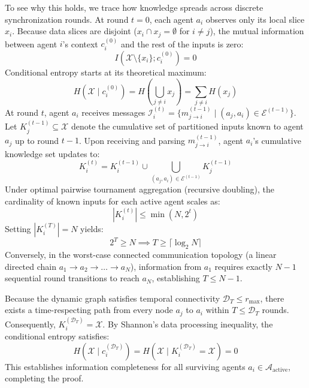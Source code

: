 \documentclass{ieeeaccess}
\begin{document}
\begin{IEEEproof}
To see why this holds, we trace how knowledge spreads across discrete synchronization rounds.
At round $t=0$, each agent $a_i$ observes only its local slice $x_i$. Because data slices are disjoint ($x_i \cap x_j = \emptyset$ for $i \neq j$), the mutual information between agent $i$'s context $c_i^{(0)}$ and the rest of the inputs is zero:
\begin{equation}
I\left( \mathcal{X} \setminus \{x_i\} ; c_i^{(0)} \right) = 0
\end{equation}
Conditional entropy starts at its theoretical maximum:
\begin{equation}
H(\mathcal{X} \mid c_i^{(0)}) = H\left(\bigcup_{j \neq i} x_j\right) = \sum_{j \neq i} H(x_j)
\end{equation}
At round $t$, agent $a_i$ receives messages $\mathcal{I}_i^{(t)} = \{ m_{j \to i}^{(t-1)} \mid (a_j, a_i) \in \mathcal{E}^{(t-1)} \}$. Let $K_j^{(t-1)} \subseteq \mathcal{X}$ denote the cumulative set of partitioned inputs known to agent $a_j$ up to round $t-1$. Upon receiving and parsing $m_{j \to i}^{(t-1)}$, agent $a_i$'s cumulative knowledge set updates to:
\begin{equation}
K_i^{(t)} = K_i^{(t-1)} \cup \bigcup_{(a_j, a_i) \in \mathcal{E}^{(t-1)}} K_j^{(t-1)}
\end{equation}
Under optimal pairwise tournament aggregation (recursive doubling), the cardinality of known inputs for each active agent scales as:
\begin{equation}
|K_i^{(t)}| \le \min\left( N, 2^t \right)
\end{equation}
Setting $|K_i^{(T)}| = N$ yields:
\begin{equation}
2^T \ge N \implies T \ge \lceil \log_2 N \rceil
\end{equation}
Conversely, in the worst-case connected communication topology (a linear directed chain $a_1 \to a_2 \to \dots \to a_N$), information from $a_1$ requires exactly $N-1$ sequential round transitions to reach $a_N$, establishing $T \le N-1$.

Because the dynamic graph satisfies temporal connectivity $\mathcal{D}_T \le r_{\max}$, there exists a time-respecting path from every node $a_j$ to $a_i$ within $T \le \mathcal{D}_T$ rounds. Consequently, $K_i^{(\mathcal{D}_T)} = \mathcal{X}$. By Shannon's data processing inequality, the conditional entropy satisfies:
\begin{equation}
H\left(\mathcal{X} \mid c_i^{(\mathcal{D}_T)}\right) = H\left(\mathcal{X} \mid K_i^{(\mathcal{D}_T)} = \mathcal{X}\right) = 0
\end{equation}
This establishes information completeness for all surviving agents $a_i \in \mathcal{A}_{\text{active}}$, completing the proof.
\end{IEEEproof}
\end{document}
